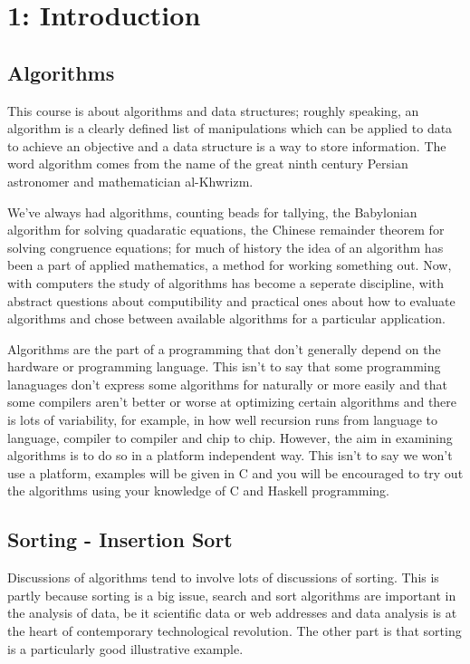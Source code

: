 \documentclass[11pt,a4paper]{scrartcl}
\begin{document}
\section*{1: Introduction}

\subsection*{Algorithms}

This course is about algorithms and data structures; roughly speaking,
an algorithm is a clearly defined list of manipulations which can be
applied to data to achieve an objective and a data structure is a way
to store information. The word algorithm comes from the name of the
great ninth century Persian astronomer and mathematician
al-Khwrizm. 

We've always had algorithms, counting beads for tallying, the
Babylonian algorithm for solving quadaratic equations, the Chinese
remainder theorem for solving congruence equations; for much of
history the idea of an algorithm has been a part of applied
mathematics, a method for working something out. Now, with computers
the study of algorithms has become a seperate discipline, with
abstract questions about computibility and practical ones about how to
evaluate algorithms and chose between available algorithms for a
particular application.

Algorithms are the part of a programming that don't generally depend
on the hardware or programming language. This isn't to say that some
programming lanaguages don't express some algorithms for naturally or
more easily and that some compilers aren't better or worse at
optimizing certain algorithms and there is lots of variability, for
example, in how well recursion runs from language to language,
compiler to compiler and chip to chip. However, the aim in examining
algorithms is to do so in a platform independent way. This isn't to
say we won't use a platform, examples will be given in C and you will
be encouraged to try out the algorithms using your knowledge of C and
Haskell programming.

\subsection*{Sorting - Insertion Sort}

Discussions of algorithms tend to involve lots of discussions of
sorting. This is partly because sorting is a big issue, search and
sort algorithms are important in the analysis of data, be it
scientific data or web addresses and data analysis is at the heart of
contemporary technological revolution. The other part is that sorting
is a particularly good illustrative example.
\end{document}
